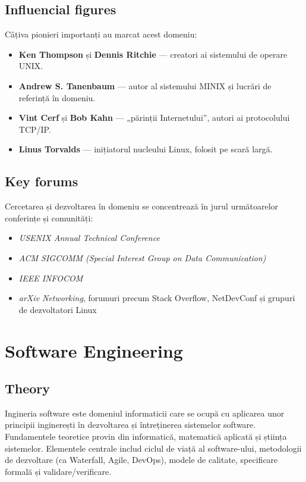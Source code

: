 \documentclass[12pt, letterpaper]{article}
\begin{document}
\subsection*{Influencial figures}
Câțiva pionieri importanți au marcat acest domeniu:
\begin{itemize}
    \item \textbf{Ken Thompson} și \textbf{Dennis Ritchie} — creatori ai sistemului de operare UNIX.
    \item \textbf{Andrew S. Tanenbaum} — autor al sistemului MINIX și lucrări de referință în domeniu.
    \item \textbf{Vint Cerf} și \textbf{Bob Kahn} — „părinții Internetului”, autori ai protocolului TCP/IP.
    \item \textbf{Linus Torvalds} — inițiatorul nucleului Linux, folosit pe scară largă.
\end{itemize}

\subsection*{Key forums}
Cercetarea și dezvoltarea în domeniu se concentrează în jurul următoarelor conferințe și comunități:
\begin{itemize}
    \item \textit{USENIX Annual Technical Conference}
    \item \textit{ACM SIGCOMM (Special Interest Group on Data Communication)}
    \item \textit{IEEE INFOCOM}
    \item \textit{arXiv Networking}, forumuri precum Stack Overflow, NetDevConf și grupuri de dezvoltatori Linux
\end{itemize}


\newpage

\section{Software Engineering}

\subsection*{Theory}
Ingineria software este domeniul informaticii care se ocupă cu aplicarea unor principii inginerești în dezvoltarea și întreținerea sistemelor software. Fundamentele teoretice provin din informatică, matematică aplicată și știința sistemelor. Elementele centrale includ ciclul de viață al software-ului, metodologii de dezvoltare (ca Waterfall, Agile, DevOps), modele de calitate, specificare formală și validare/verificare.
\end{document}
